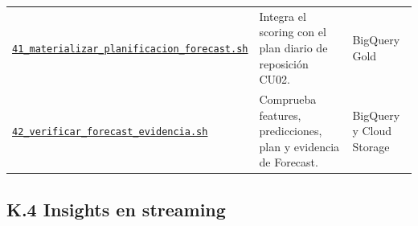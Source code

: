 \documentclass[11pt]{article}
\begin{document}
\begin{longtable}{@{}>{\raggedright\arraybackslash}p{}>{\raggedright\arraybackslash}p{}>{\raggedright\arraybackslash}p{}@{}}
\href{https://github.com/Codenid/lumina-retail-data-platform/blob/main/implementation/automatizacion/scripts41_materializar_planificacion_forecast.sh}{\texttt{41\_\allowbreak{}materializar\_\allowbreak{}planificacion\_\allowbreak{}forecast.sh}} & Integra el scoring con el plan diario de reposición CU02. & BigQuery Gold \\
\href{https://github.com/Codenid/lumina-retail-data-platform/blob/main/implementation/automatizacion/scripts42_verificar_forecast_evidencia.sh}{\texttt{42\_\allowbreak{}verificar\_\allowbreak{}forecast\_\allowbreak{}evidencia.sh}} & Comprueba features, predicciones, plan y evidencia de Forecast. & BigQuery y Cloud Storage \\
\bottomrule
\end{longtable}
\endgroup

\subsection*{K.4 Insights en streaming}
\begingroup\scriptsize
\end{document}
